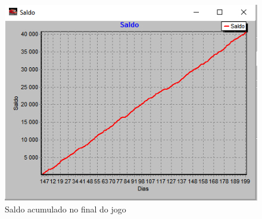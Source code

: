 \begin{figure}[<+htpb+>]
	\centering
	\includegraphics[scale=0.75]{./report-TP2/img/saldo.png}
	\caption{Saldo acumulado no final do jogo}
\label{fig:figure1}
\end{figure}
